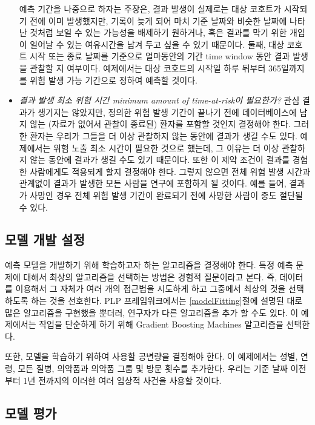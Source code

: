 \documentclass[10.5pt]{book}
\theoremstyle{definition}
\theoremstyle{definition}
\theoremstyle{definition}
\theoremstyle{remark}
\begin{document}
\begin{itemize}
  예측 기간을 나중으로 하자는 주장은, 결과 발생이 실제로는 대상 코호트가
  시작되기 전에 이미 발생했지만, 기록이 늦게 되어 마치 기준 날짜와
  비슷한 날짜에 나타난 것처럼 보일 수 있는 가능성을 배제하기 원하거나,
  혹은 결과를 막기 위한 개입이 일어날 수 있는 여유시간을 남겨 두고 싶을
  수 있기 때문이다. 둘째, 대상 코호트 시작 또는 종료 날짜를 기준으로
  얼마동안의 기간 time window 동안 결과 발생을 관찰할 지 여부이다.
  예제에서는 대상 코호트의 시작일 하루 뒤부터 365일까지를 위험 발생 가능
  기간으로 정하여 예측할 것이다.
\item
  \emph{결과 발생 최소 위험 시간 minimum amount of time-at-risk이
  필요한가?} 관심 결과가 생기지는 않았지만, 정의한 위험 발생 기간이
  끝나기 전에 데이터베이스에 남지 않는 (자료가 없어서 관찰이 종료된)
  환자를 포함할 것인지 결정해야 한다. 그러한 환자는 우리가 그들을 더
  이상 관찰하지 않는 동안에 결과가 생길 수도 있다. 예제에서는 위험 노출
  최소 시간이 필요한 것으로 했는데, 그 이유는 더 이상 관찰하지 않는
  동안에 결과가 생길 수도 있기 때문이다. 또한 이 제약 조건이 결과를
  경험한 사람에게도 적용되게 할지 결정해야 한다. 그렇지 않으면 전체 위험
  발생 시간과 관계없이 결과가 발생한 모든 사람을 연구에 포함하게 될
  것이다. 예를 들어, 결과가 사망인 경우 전체 위험 발생 기간이 완료되기
  전에 사망한 사람이 중도 절단될 수 있다.
\end{itemize}

\subsection{모델 개발 설정}\label{--}

예측 모델을 개발하기 위해 학습하고자 하는 알고리즘을 결정해야 한다. 특정
예측 문제에 대해서 최상의 알고리즘을 선택하는 방법은 경험적 질문이라고
본다. 즉, 데이터를 이용해서 그 자체가 여러 개의 접근법을 시도하게 하고
그중에서 최상의 것을 선택하도록 하는 것을 선호한다. PLP 프레임워크에서는
\ref{modelFitting}절에 설명된 대로 많은 알고리즘을 구현했을 뿐더러,
연구자가 다른 알고리즘을 추가 할 수도 있다. 이 예제에서는 작업을
단순하게 하기 위해 Gradient Boosting Machines 알고리즘을 선택한다.

또한, 모델을 학습하기 위하여 사용할 공변량을 결정해야 한다. 이
예제에서는 성별, 연령, 모든 질병, 의약품과 의약품 그룹 및 방문 횟수를
추가한다. 우리는 기준 날짜 이전부터 1년 전까지의 이러한 여러 임상적
사건을 사용할 것이다.

\subsection{모델 평가}\label{-}
\end{document}
